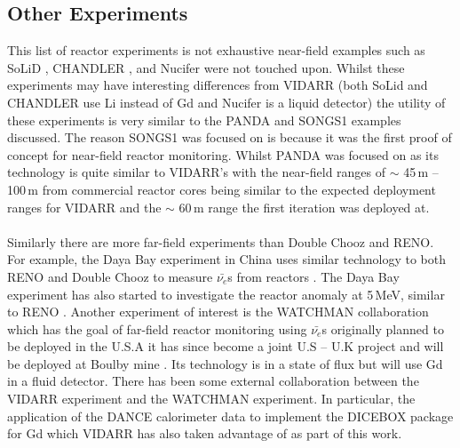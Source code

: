 \subsection{Other Experiments}
This list of reactor experiments is not exhaustive near-field examples such as SoLiD \cite{Solid_readout}, CHANDLER \cite{aap2015}, and Nucifer \cite{nucifer2016} were not touched upon. Whilst these experiments may have interesting differences from VIDARR (both SoLid and CHANDLER use Li instead of Gd and Nucifer is a liquid detector) the utility of these experiments is very similar to the PANDA and SONGS1 examples discussed. The reason SONGS1 was focused on is because it was the first proof of concept for near-field reactor monitoring. Whilst PANDA was focused on as its technology is quite similar to VIDARR's with the near-field ranges of $\sim$ 45\,m -- 100\,m from commercial reactor cores being similar to the expected deployment ranges for VIDARR and the $\sim$ 60\,m range the first iteration was deployed at. 
\\\\Similarly there are more far-field experiments than Double Chooz and RENO. For example, the Daya Bay experiment in China uses similar technology to both RENO and Double Chooz to measure $\bar{\nu_e}$s from reactors \cite{DayaBay2007Precision}. The Daya Bay experiment has also started to investigate the reactor anomaly at 5\,MeV, similar to RENO \cite{Daya_Bay_2017}. Another experiment of interest is the WATCHMAN collaboration which has the goal of far-field reactor monitoring using $\bar{\nu_e}$s originally planned to be deployed in the U.S.A \cite{askins2015physics} it has since become a joint U.S -- U.K project and will be deployed at Boulby mine \cite{burns2018remote}. Its technology is in a state of flux but will use Gd in a fluid detector. There has been some external collaboration between the VIDARR experiment and the WATCHMAN experiment. In particular, the application of the DANCE calorimeter data to implement the DICEBOX package for Gd which VIDARR has also taken advantage of as part of this work. 


